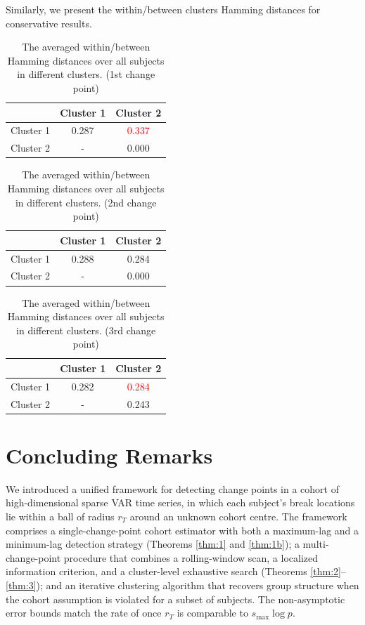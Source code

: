 \documentclass[11pt]{article}
\begin{document}
Similarly, we present the within/between clusters Hamming distances for conservative results.
\begin{table}[!ht]
    \centering
    \caption{The averaged within/between Hamming distances over all subjects in different clusters. (1st change point)}
    \label{tab:wb-dist-cp1-conserve}
    \begin{tabular}{c|c|c}
    \hline\hline
         & Cluster 1 & Cluster 2 \\
    \hline
         Cluster 1 & 0.287 & \textcolor{red}{0.337} \\
         Cluster 2 & - & 0.000 \\
    \hline\hline
    \end{tabular}
\end{table}
\begin{table}[!ht]
    \centering
    \caption{The averaged within/between Hamming distances over all subjects in different clusters. (2nd change point)}
    \label{tab:wb-dist-cp2-conserve}
    \begin{tabular}{c|c|c}
    \hline\hline
         & Cluster 1 & Cluster 2 \\
    \hline
         Cluster 1 & 0.288 & 0.284 \\
         Cluster 2 & - & 0.000 \\
    \hline\hline
    \end{tabular}
\end{table}
\begin{table}[!ht]
    \centering
    \caption{The averaged within/between Hamming distances over all subjects in different clusters. (3rd change point)}
    \label{tab:wb-dist-cp3-conserve}
    \begin{tabular}{c|c|c}
    \hline\hline
         & Cluster 1 & Cluster 2 \\
    \hline
         Cluster 1 & 0.282 & \textcolor{red}{0.284} \\
         Cluster 2 & - & 0.243 \\
    \hline\hline
    \end{tabular}
\end{table}

\section{Concluding Remarks}\label{sec:conclude}
We introduced a unified framework for detecting change points in a cohort of high-dimensional sparse VAR time series, in which each subject's break locations lie within a ball of radius $r_T$ around an unknown cohort centre. The framework comprises a single-change-point cohort estimator with both a maximum-lag and a minimum-lag detection strategy (Theorems \ref{thm:1} and \ref{thm:1b}); a multi-change-point procedure that combines a rolling-window scan, a localized information criterion, and a cluster-level exhaustive search (Theorems \ref{thm:2}--\ref{thm:3}); and an iterative clustering algorithm that recovers group structure when the cohort assumption is violated for a subset of subjects. The non-asymptotic error bounds match the rate of \cite{wang2019localizing} once $r_T$ is comparable to $s_{\max}\log p$.
\end{document}
